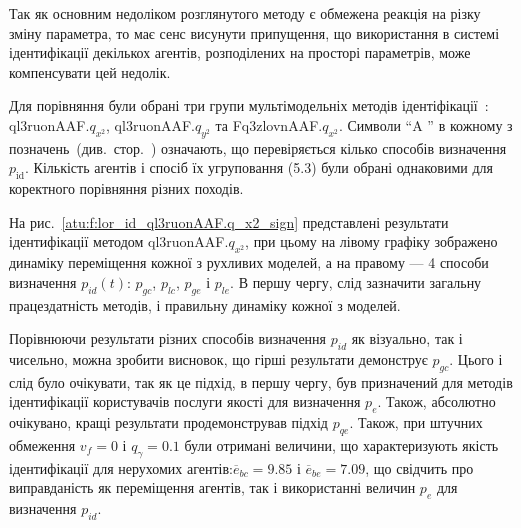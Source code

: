 Так як основним недоліком розглянутого методу є обмежена
реакція на різку зміну параметра, то має сенс висунути
припущення, що використання в системі ідентифікації декількох
агентів, розподілених на просторі параметрів, може компенсувати
цей недолік.


Для порівняння були обрані три групи мультімодельніх методів
ідентіфікації~\cite{atu_ISDMCI2015,atu_asau26}:
ql3ruonAAF.$q_{x^2} $,
ql3ruonAAF.$q_{y^2} $ та
Fq3zlovnAAF.$q_{x^2} $.
Символи ``A '' в кожному з позначень~(див.~стор.~\pageref{atu:id_classification}) означають, що
перевіряється кілько способів визначення
$ p_\mathrm{id} $. Кількість агентів і спосіб їх угруповання (5.3) були
обрані однаковими для коректного порівняння різних походів.


На рис.~\ref{atu:f:lor_id_ql3ruonAAF.q_x2_sign} представлені результати
ідентифікації методом ql3ruonAAF.$q_{x^2} $, при цьому на лівому графіку зображено динаміку
переміщення кожної з рухливих моделей, а на правому --- 4 способи
визначення
$ p_{id} (t)$:
$ p_{gc} $,
$ p_{lc} $,
$ p_{ge} $ і
$ p_{le} $. В першу чергу, слід зазначити загальну працездатність
методів, і правильну динаміку кожної з моделей.


Порівнюючи результати різних способів визначення
$ p_{id} $ як візуально, так і чисельно, можна зробити висновок, що
гірші результати демонструє
$ p_{gc} $. Цього і слід було очікувати, так як це підхід, в першу
чергу, був призначений для методів ідентифікації користувачів
послуги якості для визначення
$ p_e $. Також, абсолютно очікувано, кращі результати
продемонстрував підхід
$ p_{qe} $. Також, при штучних обмеження
$ v_f = 0 $ і
$ q_\gamma = 0.1 $ були отримані величини, що характеризують якість
ідентифікації для нерухомих агентів:$ \overline{e}_{bc} = 9.85 $ і
$ \overline{e}_{be} = 7.09 $, що свідчить про виправданість як переміщення
агентів, так і використанні величин
$ p_e $ для визначення
$ p_{id} $.



